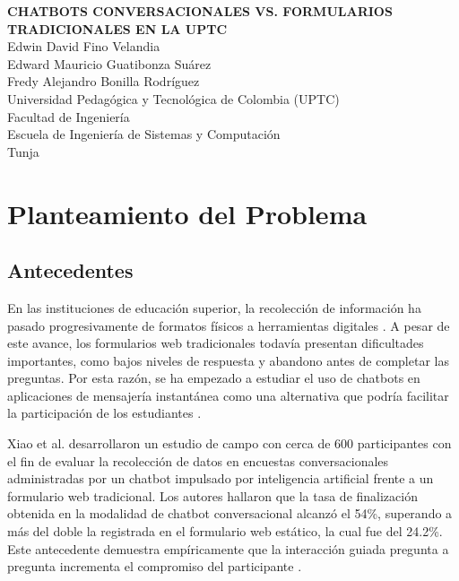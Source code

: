 \documentclass[12pt,letterpaper]{article}
\begin{document}
\begin{titlepage}
    \thispagestyle{empty}
    \centering
    \vspace*{2cm}
    {\LARGE \textbf{CHATBOTS CONVERSACIONALES VS. FORMULARIOS TRADICIONALES EN LA UPTC}}\\[3cm]
    {\large Edwin David Fino Velandia\\ Edward Mauricio Guatibonza Suárez\\ Fredy Alejandro Bonilla Rodríguez}\\[2cm]
    {\large Universidad Pedagógica y Tecnológica de Colombia (UPTC)}\\
    {\large Facultad de Ingeniería}\\
    {\large Escuela de Ingeniería de Sistemas y Computación}\\[2cm]
    {\large Tunja}\\
    {\large \the\year}
\end{titlepage}

\newpage

\thispagestyle{empty}
\tableofcontents
\newpage

\setcounter{page}{1}

\section{Planteamiento del Problema}

\subsection{Antecedentes}

En las instituciones de educación superior, la recolección de información ha pasado progresivamente de formatos físicos a herramientas digitales \cite{kim2019, hernandez2014}. A pesar de este avance, los formularios web tradicionales todavía presentan dificultades importantes, como bajos niveles de respuesta y abandono antes de completar las preguntas. Por esta razón, se ha empezado a estudiar el uso de chatbots en aplicaciones de mensajería instantánea como una alternativa que podría facilitar la participación de los estudiantes \cite{xiao2020, beam2023}.

Xiao et al. \cite{xiao2020} desarrollaron un estudio de campo con cerca de 600 participantes con el fin de evaluar la recolección de datos en encuestas conversacionales administradas por un chatbot impulsado por inteligencia artificial frente a un formulario web tradicional. Los autores hallaron que la tasa de finalización obtenida en la modalidad de chatbot conversacional alcanzó el 54\%, superando a más del doble la registrada en el formulario web estático, la cual fue del 24.2\%. Este antecedente demuestra empíricamente que la interacción guiada pregunta a pregunta incrementa el compromiso del participante \cite{xiao2020}.
\end{document}
